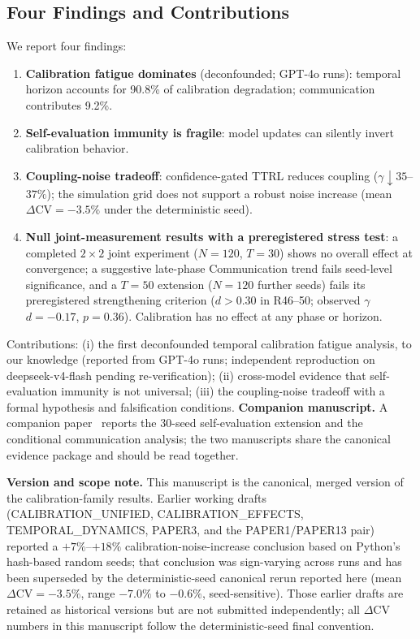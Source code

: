 \documentclass[11pt]{article}
\newcommand{\CV}{\ensuremath{\mathrm{CV}}}
\theoremstyle{definition}
\theoremstyle{remark}
\begin{document}
\subsection{Four Findings and Contributions}

We report four findings:
\begin{enumerate}[leftmargin=*,nosep]
    \item \textbf{Calibration fatigue dominates} (deconfounded; GPT-4o runs): temporal horizon accounts for 90.8\% of calibration degradation; communication contributes 9.2\%.
    \item \textbf{Self-evaluation immunity is fragile}: model updates can silently invert calibration behavior.
    \item \textbf{Coupling-noise tradeoff}: confidence-gated TTRL reduces coupling ($\gamma \downarrow 35$--$37\%$); the simulation grid does not support a robust noise increase (mean $\Delta\CV = -3.5\%$ under the deterministic seed).
    \item \textbf{Null joint-measurement results with a preregistered stress test}: a completed $2 \times 2$ joint experiment ($N{=}120$, $T{=}30$) shows no overall effect at convergence; a suggestive late-phase Communication trend fails seed-level significance, and a $T{=}50$ extension ($N{=}120$ further seeds) fails its preregistered strengthening criterion ($d > 0.30$ in R46--50; observed $\gamma$ $d{=}-0.17$, $p{=}0.36$). Calibration has no effect at any phase or horizon.
\end{enumerate}

\noindent Contributions: (i) the first deconfounded temporal calibration fatigue analysis, to our knowledge (reported from GPT-4o runs; independent reproduction on deepseek-v4-flash pending re-verification); (ii) cross-model evidence that self-evaluation immunity is not universal; (iii) the coupling-noise tradeoff with a formal hypothesis and falsification conditions. \textbf{Companion manuscript.} A companion paper~\citep{companion2026} reports the 30-seed self-evaluation extension and the conditional communication analysis; the two manuscripts share the canonical evidence package and should be read together.

\textbf{Version and scope note.} This manuscript is the canonical, merged version of the calibration-family results. Earlier working drafts (CALIBRATION\_UNIFIED, CALIBRATION\_EFFECTS, TEMPORAL\_DYNAMICS, PAPER3, and the PAPER1/PAPER13 pair) reported a $+7\%$--$+18\%$ calibration-noise-increase conclusion based on Python's hash-based random seeds; that conclusion was sign-varying across runs and has been superseded by the deterministic-seed canonical rerun reported here (mean $\Delta\CV = -3.5\%$, range $-7.0\%$ to $-0.6\%$, seed-sensitive). Those earlier drafts are retained as historical versions but are not submitted independently; all $\Delta\CV$ numbers in this manuscript follow the deterministic-seed final convention.
\end{document}
